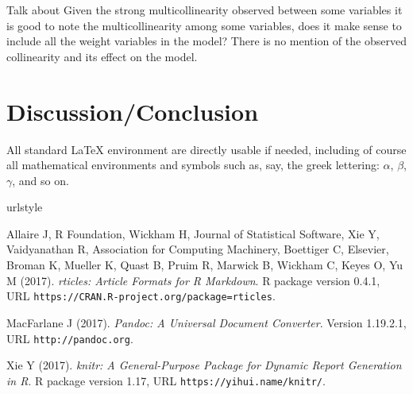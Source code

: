 \documentclass[letterpaper,9pt,twocolumn,twoside,]{pinp}
\begin{document}
Talk about Given the strong multicollinearity observed between some
variables it is good to note the multicollinearity among some variables,
does it make sense to include all the weight variables in the model?
There is no mention of the observed collinearity and its effect on the
model.

\section{Discussion/Conclusion}\label{discussionconclusion}

All standard LaTeX environment are directly usable if needed, including
of course all mathematical environments and symbols such as, say, the
greek lettering: \(\alpha\), \(\beta\), \(\gamma\), and so on.


\pnasbreak 



\begin{thebibliography}{3}
\newcommand{\enquote}[1]{``#1''}
\providecommand{\natexlab}[1]{#1}
\providecommand{\url}[1]{\texttt{#1}}
\providecommand{\urlprefix}{URL }
\expandafter\ifx\csname urlstyle\endcsname\relax
  \providecommand{\doi}[1]{doi:\discretionary{}{}{}#1}\else
  \providecommand{\doi}{doi:\discretionary{}{}{}\begingroup
  \urlstyle{rm}\Url}\fi
\providecommand{\eprint}[2][]{\url{#2}}

Allaire J, {R Foundation}, Wickham H, {Journal of Statistical Software}, Xie Y,
  Vaidyanathan R, {Association for Computing Machinery}, Boettiger C,
  {Elsevier}, Broman K, Mueller K, Quast B, Pruim R, Marwick B, Wickham C,
  Keyes O, Yu M (2017).
\newblock \emph{rticles: Article Formats for R Markdown}.
\newblock R package version 0.4.1,
  \urlprefix\url{https://CRAN.R-project.org/package=rticles}.

MacFarlane J (2017).
\newblock \emph{Pandoc: A Universal Document Converter}.
\newblock Version 1.19.2.1, \urlprefix\url{http://pandoc.org}.

Xie Y (2017).
\newblock \emph{knitr: A General-Purpose Package for Dynamic Report Generation
  in R}.
\newblock R package version 1.17, \urlprefix\url{https://yihui.name/knitr/}.

\end{thebibliography}
\end{document}

